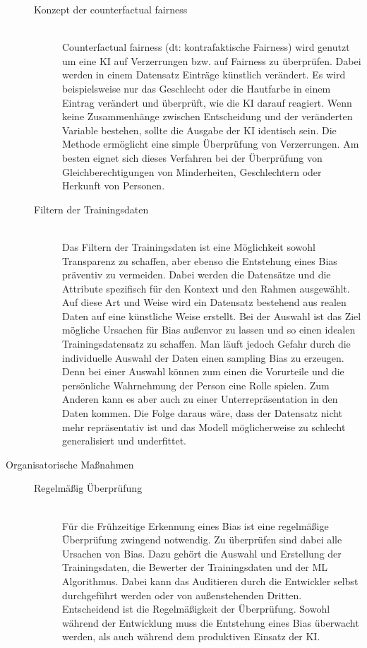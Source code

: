 \begin{onehalfspace}
\begin{description}
\begin{description}
                \item[Konzept der \glqq{}counterfactual fairness\grqq{}] \hfill \\
                \glqq{}Counterfactual fairness\grqq{} (\ac*{dt}: kontrafaktische Fairness) wird genutzt um eine \ac*{KI} auf Verzerrungen bzw. auf Fairness zu überprüfen. Dabei werden in einem Datensatz Einträge künstlich verändert. Es wird beispielsweise nur das Geschlecht oder die Hautfarbe in einem Eintrag verändert und überprüft, wie die \ac*{KI} darauf reagiert. Wenn keine Zusammenhänge zwischen Entscheidung und der veränderten Variable bestehen, sollte die Ausgabe der \ac*{KI} identisch sein. Die Methode ermöglicht eine simple Überprüfung von Verzerrungen. Am besten eignet sich dieses Verfahren bei der Überprüfung von Gleichberechtigungen von Minderheiten, Geschlechtern oder Herkunft von Personen.\cite{hagendorff2019maschinelles}

                \item[Filtern der Trainingsdaten] \hfill \\
                Das Filtern der Trainingsdaten ist eine Möglichkeit sowohl Transparenz zu schaffen, aber ebenso die Entstehung eines Bias präventiv zu vermeiden. Dabei werden die Datensätze und die Attribute spezifisch für den Kontext und den Rahmen ausgewählt. Auf diese Art und Weise wird ein Datensatz bestehend aus realen Daten auf eine künstliche Weise erstellt. Bei der Auswahl ist das Ziel mögliche Ursachen für Bias au{\ss}envor zu lassen und so einen idealen Trainingsdatensatz zu schaffen.
                Man läuft jedoch Gefahr durch die individuelle Auswahl der Daten einen sampling Bias zu erzeugen. Denn bei einer Auswahl können zum einen die Vorurteile und die persönliche Wahrnehmung der Person eine Rolle spielen. Zum Anderen kann es aber auch zu einer Unterrepräsentation in den Daten kommen. Die Folge daraus wäre, dass der Datensatz nicht mehr repräsentativ ist und das Modell möglicherweise zu schlecht generalisiert und underfittet.\cite{Google}\cite{ntoutsi2020bias}

            \end{description}

            \item[Organisatorische Maßnahmen] \hfill
            \begin{description}
                \item [Regelmäßig Überprüfung] \hfill \\
                Für die Frühzeitige Erkennung eines Bias ist eine regelmäßige Überprüfung zwingend notwendig. Zu überprüfen sind dabei alle Ursachen von Bias. Dazu gehört die Auswahl und Erstellung der Trainingsdaten, die Bewerter der Trainingsdaten und der \ac{ML} Algorithmus. 
                Dabei kann das Auditieren durch die Entwickler selbst durchgeführt werden oder von au{\ss}enstehenden Dritten. Entscheidend ist die Regelmäßigkeit der Überprüfung. Sowohl während der Entwicklung muss die Entstehung eines Bias überwacht werden, als auch während dem produktiven Einsatz der \ac{KI}.\cite{Drew2019}\cite{hagendorff2019maschinelles}\cite{Dilmegani2020}\cite{Google}


\end{description}
\end{description}
\end{onehalfspace}
